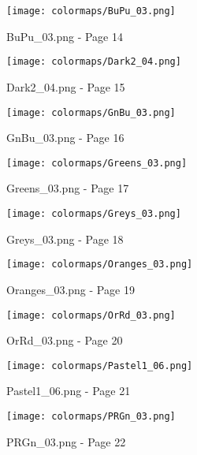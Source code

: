 \documentclass{article}%
\begin{document}
%


\begin{figure}[h!]%
\centering%
\texttt{[image: colormaps/BuPu\_03.png]}%
\caption{BuPu\_03.png {-} Page 14}%
\end{figure}

%


\begin{figure}[h!]%
\centering%
\texttt{[image: colormaps/Dark2\_04.png]}%
\caption{Dark2\_04.png {-} Page 15}%
\end{figure}

%


\begin{figure}[h!]%
\centering%
\texttt{[image: colormaps/GnBu\_03.png]}%
\caption{GnBu\_03.png {-} Page 16}%
\end{figure}

%


\begin{figure}[h!]%
\centering%
\texttt{[image: colormaps/Greens\_03.png]}%
\caption{Greens\_03.png {-} Page 17}%
\end{figure}

%


\begin{figure}[h!]%
\centering%
\texttt{[image: colormaps/Greys\_03.png]}%
\caption{Greys\_03.png {-} Page 18}%
\end{figure}

%


\begin{figure}[h!]%
\centering%
\texttt{[image: colormaps/Oranges\_03.png]}%
\caption{Oranges\_03.png {-} Page 19}%
\end{figure}

%


\begin{figure}[h!]%
\centering%
\texttt{[image: colormaps/OrRd\_03.png]}%
\caption{OrRd\_03.png {-} Page 20}%
\end{figure}

%


\begin{figure}[h!]%
\centering%
\texttt{[image: colormaps/Pastel1\_06.png]}%
\caption{Pastel1\_06.png {-} Page 21}%
\end{figure}

%


\begin{figure}[h!]%
\centering%
\texttt{[image: colormaps/PRGn\_03.png]}%
\caption{PRGn\_03.png {-} Page 22}%
\end{figure}
\end{document}
